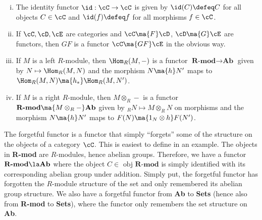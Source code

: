 \begin{ex} \hfill
	\begin{enumerate}[(i)]
	\item The identity functor $\id: \cC \rightarrow \cC$ is given by $\id(C) \defeq C$ for all objects $C \in \cC$ and $\id(f) \defeq f$ for all morphisms $f \in \cC$.
	\item If $\cC,\cD,\cE$ are categories and $\cC \ma{F} \cD$, $\cD \ma{G} \cE$ are functors, then $GF$ is a functor $\cC \ma{GF} \cE$ in the obvious way. 
	\item If $M$ is a left $R$-module, then $\Hom_R(M,-)$ is a functor $\textbf{R-mod} \rightarrow \textbf{Ab}$ given by $N \mapsto \Hom_R(M,N)$ and the morphism $N \ma{h} N'$ maps to $\Hom_R(M,N) \ma{h_*} \Hom_R(M,N')$. 
	\item If $M$ is a right $R$-module, then $M \otimes_R -$ is a functor $\textbf{R-mod} \ma{M \otimes_R -} \textbf{Ab}$ given by $_R N \mapsto M \otimes_R N$ on morphisms and the morphism $N \ma{h} N'$ maps to $F(N) \ma{1_N \otimes h} F(N')$. 
	\end{enumerate} \xqed
\end{ex}


\begin{ex}
The forgetful functor is a functor that simply ``forgets'' some of the structure on the objects of a category $\cC$. This is easiest to define in an example. The objects in \textbf{R-mod} are $R$-modules, hence abelian groups. Therefore, we have a functor $\textbf{R-mod} \la \textbf{Ab}$ where the object $C \in \text{ obj} \textbf{ R-mod}$ is simply identified with its corresponding abelian group under addition. Simply put, the forgetful functor has forgotten the $R$-module structure of the set and only remembered its abelian group structure. We also have a forgetful functor from \textbf{Ab} to \textbf{Sets} (hence also from \textbf{R-mod} to \textbf{Sets}), where the functor only remembers the set structure on \textbf{Ab}. \xqed
\end{ex}


